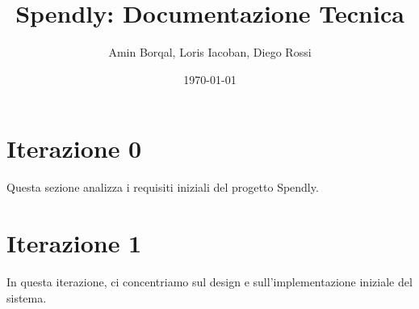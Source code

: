 \documentclass{softwaredoc}
\title{Spendly: Documentazione Tecnica}
\author{Amin Borqal, Loris Iacoban, Diego Rossi}
\date{\today}
\begin{document}
\maketitle
\newpage %
\thispagestyle{empty} %
\mbox{} %
\newpage 

\tableofcontents
{} %
\newpage
\listoffigures
\listoftables
\newpage 
\section*{Iterazione 0}
Questa sezione analizza i requisiti iniziali del progetto Spendly.


\newpage

\newpage



\newpage

\newpage



\newpage
\section*{Iterazione 1}
In questa iterazione, ci concentriamo sul design e sull'implementazione iniziale del sistema.


\newpage

\end{document}
